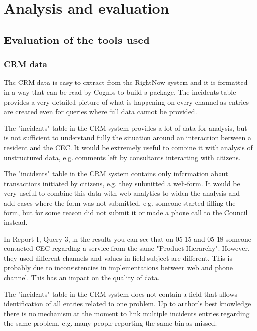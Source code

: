
\chapter{Analysis and evaluation}
	\section{Evaluation of the tools used}

		\subsection{CRM data}
		
The CRM data is easy to extract from the RightNow system and it is formatted in a way that can be read by Cognos to build a package. The incidents table provides a very detailed picture of what is happening on every channel as entries are created even for queries where full data cannot be provided.

The "incidents" table in the CRM system provides a lot of data for analysis, but is not sufficient to understand fully the situation around an interaction between a resident and the CEC. It would be extremely useful to combine it with analysis of unstructured data, e.g. comments left by consultants interacting with citizens.

The "incidents" table in the CRM system contains only information about transactions initiated by citizens, e.g. they submitted a web-form. It would be very useful to combine this data with web analytics to widen the analysis and add cases where the form was not submitted, e.g. someone started filling the form, but for some reason did not submit it or made a phone call to the Council instead.

In Report 1, Query 3, in the results you can see that on 05-15 and 05-18 someone contacted CEC regarding a service from the same "Product Hierarchy". However, they used different channels and values in field subject are different. This is probably due to inconsistencies in implementations between web and phone channel. This has an impact on the quality of data. 

The "incidents" table in the CRM system does not contain a field that allows identification of all entries related to one problem. Up to author's best knowledge there is no mechanism at the moment to link multiple incidents entries regarding the same problem, e.g. many people reporting the same bin as missed. 

